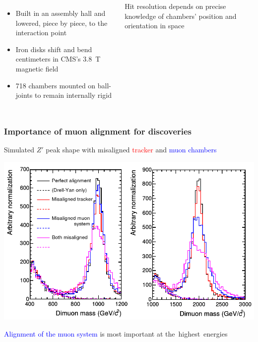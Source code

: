 \documentclass[compress]{beamer}
\begin{document}
\begin{frame}
\begin{columns}
\vspace{-0.5 cm}
\begin{itemize}
\item Built in an assembly hall and lowered, piece by piece, to the interaction point
\item Iron disks shift and bend centimeters in CMS's 3.8~T magnetic field
\item 718 chambers mounted on ball-joints to remain internally rigid
\end{itemize}

\vspace{0.25 cm}
\hfill \begin{minipage}{0.95\linewidth}
Hit resolution depends on precise knowledge of chambers' position and orientation in space
\end{minipage} \hfill \mbox{ }

\end{columns}
\end{frame}

\begin{frame}
\frametitle{Importance of muon alignment for discoveries}

\vfill
Simulated $Z'$ peak shape with misaligned \textcolor{red}{tracker} and \textcolor{blue}{muon chambers}

\vfill \includegraphics[width=\linewidth]{misaligned_spectra.png}

\vfill
\textcolor{blue}{Alignment of the muon system} is most important at \mbox{the highest energies\hspace{-1 cm}}
\end{frame}
\end{document}
